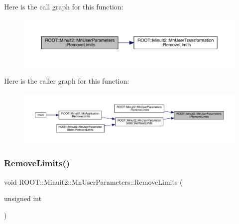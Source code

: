 Here is the call graph for this function\+:\nopagebreak
\begin{figure}[H]
\begin{center}
\leavevmode
\includegraphics[width=350pt]{d6/d10/classROOT_1_1Minuit2_1_1MnUserParameters_a399fd2fff4e1055c0878c8ce24205544_cgraph}
\end{center}
\end{figure}
Here is the caller graph for this function\+:\nopagebreak
\begin{figure}[H]
\begin{center}
\leavevmode
\includegraphics[width=350pt]{d6/d10/classROOT_1_1Minuit2_1_1MnUserParameters_a399fd2fff4e1055c0878c8ce24205544_icgraph}
\end{center}
\end{figure}
\mbox{\label{classROOT_1_1Minuit2_1_1MnUserParameters_a399fd2fff4e1055c0878c8ce24205544}} 
\subsubsection{\texorpdfstring{RemoveLimits()}{RemoveLimits()}\hspace{0.1cm}{\footnotesize\ttfamily [2/4]}}
{\footnotesize\ttfamily void R\+O\+O\+T\+::\+Minuit2\+::\+Mn\+User\+Parameters\+::\+Remove\+Limits (\begin{DoxyParamCaption}\item[{unsigned int}]{ }\end{DoxyParamCaption})}

\mbox{\label{classROOT_1_1Minuit2_1_1MnUserParameters_a4aff83aa7fb5e9c0a7edf70f360f68fa}} 
